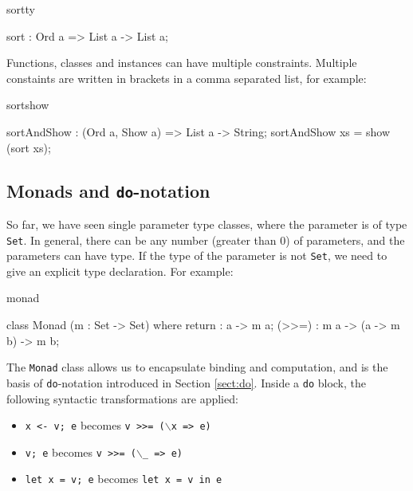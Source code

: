 \begin{SaveVerbatim}{sortty}

sort : Ord a => List a -> List a;

\end{SaveVerbatim}

\noindent
Functions, classes and instances can have multiple constraints. Multiple constaints are
written in brackets in a comma separated list, for example:

\begin{SaveVerbatim}{sortshow}

sortAndShow : (Ord a, Show a) => List a -> String;
sortAndShow xs = show (sort xs);

\end{SaveVerbatim}

\subsection{Monads and \texttt{do}-notation}

\label{sec:monad}

So far, we have seen single parameter type classes, where the parameter is of type
\texttt{Set}. In general, there can be any number (greater than 0) of parameters,
and the parameters can have  type.
If the type of the parameter is not \texttt{Set}, we need to give an explicit type
declaration. For example:

\begin{SaveVerbatim}{monad}

class Monad (m : Set -> Set) where {
    return : a -> m a;
    (>>=)  : m a -> (a -> m b) -> m b;
}

\end{SaveVerbatim}

\noindent
The \texttt{Monad} class allows us to encapsulate binding and computation, and is the
basis of \texttt{do}-notation introduced in Section \ref{sect:do}. Inside a
\texttt{do} block, the following syntactic transformations are applied:

\begin{itemize}
\item \texttt{x <- v; e} becomes \texttt{v >>= ($\backslash$x => e)}
\item \texttt{v; e} becomes \texttt{v >>= ($\backslash$\_ => e)}
\item \texttt{let x = v; e} becomes \texttt{let x = v in e}
\end{itemize}

